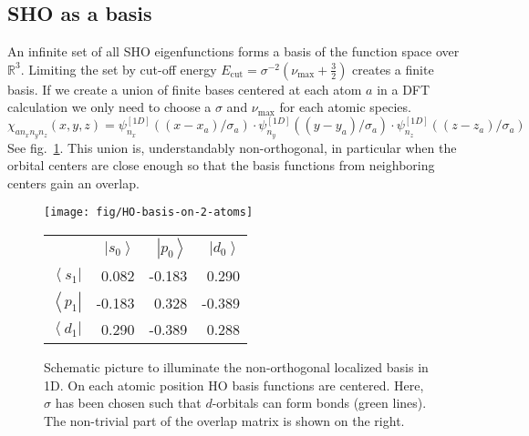 \documentclass[oribibl]{llncs}
\newcommand{\um}[1]{_{\mathrm{#1}}}
\newcommand{\ket}[1]{\left| #1 \right\rangle}
\newcommand{\bra}[1]{\left\langle #1 \right|}
\begin{document}
\subsection{SHO as a basis}
An infinite set of all \ac{SHO} eigenfunctions forms a basis of the function space over $\mathbb R^3$.
Limiting the set by cut-off energy $E\um{cut} = \sigma^{-2} (\nu\um{max} + \frac 32)$
creates a finite basis.
If we create a union of finite bases centered at each atom $a$ in a \ac{DFT} calculation 
we only need to choose a $\sigma$ and $\nu\um{max}$ for each atomic species.
\begin{equation}
  \chi_{a n_x n_y n_z}(x,y,z) = \psi^{[1D]}_{n_x}((x - x_a)/\sigma_a) 
                          \cdot \psi^{[1D]}_{n_y}((y - y_a)/\sigma_a) 
                          \cdot \psi^{[1D]}_{n_z}((z - z_a)/\sigma_a)
  \label{eqn:localized-basis}
\end{equation}
See fig.~\ref{fig:HO-basis-on-2-atoms}.
This union is, understandably non-orthogonal, in particular when the orbital centers
are close enough so that the basis functions from neighboring centers gain an overlap.
%
\begin{figure}
  \begin{minipage}[c]{.58\textwidth}
	\texttt{[image: fig/HO-basis-on-2-atoms]} %
  \end{minipage}\hfill
  \begin{minipage}[c]{.41\textwidth}
  

		\begin{tabular}{r rrr}
		\toprule
				    & $\ket{s_0}$ & $\ket{p_0}$ & $\ket{d_0}$ \\
				$\bra{s_1}$  &      0.082 &  -0.183 &  0.290  \\
				$\bra{p_1}$  &     -0.183 &   0.328 & -0.389  \\
				$\bra{d_1}$  &      0.290 &  -0.389 &  0.288  \\
		\bottomrule
		\end{tabular}

  \end{minipage}
  \label{fig:HO-basis-on-2-atoms}
  \caption{
Schematic picture to illuminate the non-orthogonal localized basis in 1D.
On each atomic position \ac{HO} basis functions are centered.
Here, $\sigma$ has been chosen such that $d$-orbitals can form bonds (green lines).
The non-trivial part of the overlap matrix is shown on the right.
  }
\end{figure}
%
%
\end{document}
